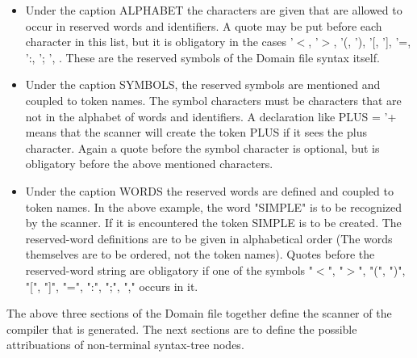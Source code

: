\begin{itemize}
\item
Under the caption ALPHABET the characters are given that are allowed to
occur in reserved words and identifiers. A quote may be put before each
character in this list, but it is obligatory in the cases
'$<$, '$>$, '(, '), '[, '], '=, ':, '; ', . These are the reserved symbols of
the Domain file syntax itself.
\item
Under the caption SYMBOLS, the reserved symbols are mentioned and coupled
to token names. The symbol characters must be
characters that are not in the alphabet of words and identifiers. A
declaration like PLUS = '+ means that the scanner will create the token PLUS
if it sees the plus character. Again a quote before the symbol character
is optional, but is obligatory before the above mentioned characters.
\item
Under the caption WORDS the reserved words are defined and coupled to token
names. In the above example, the word "SIMPLE" is to be recognized by the
scanner. If it is encountered the token SIMPLE is to be created.
The reserved-word definitions are to be given in alphabetical order (The
words themselves are to be ordered, not the token names). Quotes before
the reserved-word string are obligatory if one of the symbols
"$<$", "$>$", "(", ")", "[", "]", "=", ":", ";", "," occurs in it.
\end{itemize}
The above three sections of the Domain file together define the scanner of
the compiler that is generated. The next sections are to define the possible
attribuations of non-terminal syntax-tree nodes.
